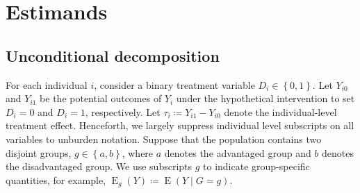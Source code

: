 \documentclass[12pt,a4paper]{article}
\newcommand{\E}{\operatorname{E}}
\begin{document}


\section{Estimands}
\subsection{Unconditional decomposition}
For each individual $i$, consider a binary treatment variable $D_i \in \left\lbrace 0,1 \right\rbrace$. Let $Y_{i0}$ and $Y_{i1}$ be the potential outcomes \citep{rubin_estimating_1974} of $Y_i$ under the hypothetical intervention to set $D_i=0$ and $D_i=1$, respectively. Let $\tau_i \coloneqq Y_{i1} - Y_{i0}$ denote the individual-level treatment effect. Henceforth, we largely suppress individual level subscripts on all variables to unburden notation. Suppose that the population contains two disjoint groups, $g \in \left\lbrace a,b \right\rbrace$, where $a$ denotes the advantaged group and $b$ denotes the disadvantaged group. We use subscripts $g$ to indicate group-specific quantities, for example, $\E_g(Y) \coloneqq \E(Y \mid G=g)$.  
\end{document}
